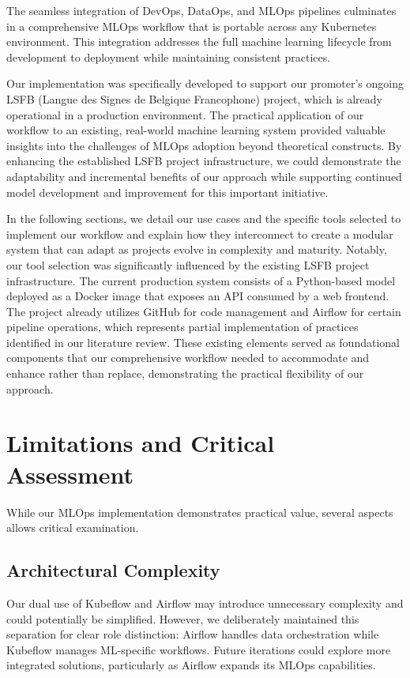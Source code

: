 The seamless integration of DevOps, DataOps, and MLOps pipelines culminates in a comprehensive MLOps workflow that is portable across any Kubernetes environment.
This integration addresses the full machine learning lifecycle from development to deployment while maintaining consistent practices. %

Our implementation was specifically developed to support our promoter's ongoing LSFB (Langue des Signes de Belgique Francophone) project, which is already operational in a production environment.
The practical application of our workflow to an existing, real-world machine learning system provided valuable insights into the challenges of MLOps adoption beyond theoretical constructs.
By enhancing the established LSFB project infrastructure, we could demonstrate the adaptability and incremental benefits of our approach while supporting continued model development and improvement for this important initiative.

In the following sections, we detail our use cases and the specific tools selected to implement our workflow and explain how they interconnect to create a modular system that can adapt as projects evolve in complexity and maturity.
Notably, our tool selection was significantly influenced by the existing LSFB project infrastructure.
The current production system consists of a Python-based model deployed as a Docker image that exposes an API consumed by a web frontend.
The project already utilizes GitHub for code management and Airflow for certain pipeline operations, which represents partial implementation of practices identified in our literature review.
These existing elements served as foundational components that our comprehensive workflow needed to accommodate and enhance rather than replace, demonstrating the practical flexibility of our approach.







\section{Limitations and Critical Assessment}\label{sec:limitations-and-critical-assessment}

While our MLOps implementation demonstrates practical value, several aspects allows critical examination.
\subsection*{Architectural Complexity}
Our dual use of Kubeflow and Airflow may introduce unnecessary complexity and could potentially be simplified.
However, we deliberately maintained this separation for clear role distinction: Airflow handles data orchestration while Kubeflow manages ML-specific workflows.
Future iterations could explore more integrated solutions, particularly as Airflow expands its MLOps capabilities.
